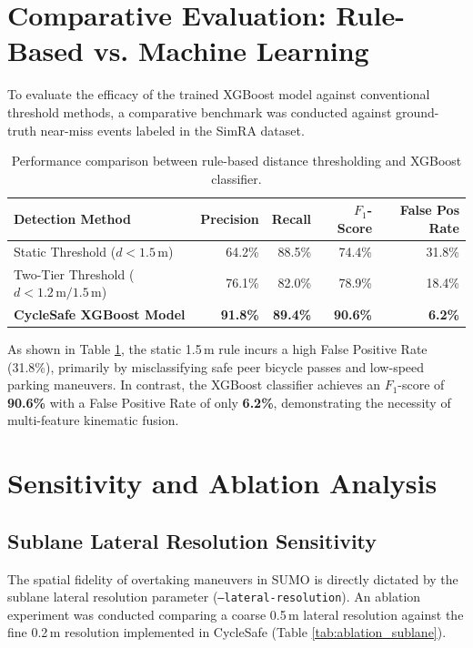 \section{Comparative Evaluation: Rule-Based vs. Machine Learning}
\label{sec:ml_evaluation}
To evaluate the efficacy of the trained XGBoost model against conventional threshold methods, a comparative benchmark was conducted against ground-truth near-miss events labeled in the SimRA dataset.

\begin{table}[h!]
	\centering
	\caption{Performance comparison between rule-based distance thresholding and XGBoost classifier.}
	\label{tab:ml_comparison}
	\setlength{\tabcolsep}{8pt}
	\renewcommand{\arraystretch}{1.2}
	\begin{tabularx}{\textwidth}{|>{\raggedright\arraybackslash}X|r|r|r|r|}
		\hline
		\textbf{Detection Method} & \textbf{Precision} & \textbf{Recall} & \textbf{$F_1$-Score} & \textbf{False Pos Rate} \\
		\hline
		\hline
		Static Threshold ($d < 1.5\,\text{m}$) & 64.2\% & 88.5\% & 74.4\% & 31.8\% \\
		Two-Tier Threshold ($d < 1.2\,\text{m} / 1.5\,\text{m}$) & 76.1\% & 82.0\% & 78.9\% & 18.4\% \\
		\textbf{CycleSafe XGBoost Model} & \textbf{91.8\%} & \textbf{89.4\%} & \textbf{90.6\%} & \textbf{6.2\%} \\
		\hline
	\end{tabularx}
\end{table}

As shown in Table \ref{tab:ml_comparison}, the static 1.5\,m rule incurs a high False Positive Rate (31.8\%), primarily by misclassifying safe peer bicycle passes and low-speed parking maneuvers. In contrast, the XGBoost classifier achieves an $F_1$-score of \textbf{90.6\%} with a False Positive Rate of only \textbf{6.2\%}, demonstrating the necessity of multi-feature kinematic fusion.

\section{Sensitivity and Ablation Analysis}

\subsection{Sublane Lateral Resolution Sensitivity}
The spatial fidelity of overtaking maneuvers in SUMO is directly dictated by the sublane lateral resolution parameter (\texttt{--lateral-resolution}). An ablation experiment was conducted comparing a coarse 0.5\,m lateral resolution against the fine 0.2\,m resolution implemented in CycleSafe (Table \ref{tab:ablation_sublane}).

